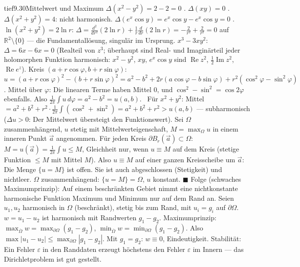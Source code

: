 \begin{loesungkarte}{tief}{9.30}{Mittelwert und Maximum}
$\Delta(x^{2} - y^{2}) = 2 - 2 = 0$ \checkmark. $\Delta(xy) = 0$ \checkmark. $\Delta(x^{2} + y^{2}) = 4$: nicht harmonisch. $\Delta(e^{x}\cos y) = e^{x}\cos y - e^{x}\cos y = 0$ \checkmark. $\ln(x^{2} + y^{2}) = 2\ln r$: $\Delta = \frac{d^{2}}{dr^{2}}(2\ln r) + \frac1r\frac d{dr}(2\ln r) = -\frac2{r^{2}} + \frac2{r^{2}} = 0$ auf $\mathbb R^{2}\setminus\{0\}$ \checkmark --- die Fundamentallösung, singulär im Ursprung. $x^{3} - 3xy^{2}$: $\Delta = 6x - 6x = 0$ \checkmark (Realteil von $z^{3}$; überhaupt sind Real- und Imaginärteil jeder holomorphen Funktion harmonisch: $x^{2} - y^{2}$, $xy$, $e^{x}\cos y$ sind $\operatorname{Re}z^{2}$, $\frac12\operatorname{Im}z^{2}$, $\operatorname{Re}e^{z}$).
Kreis $(a + r\cos\varphi, b + r\sin\varphi)$: $u = (a + r\cos\varphi)^{2} - (b + r\sin\varphi)^{2} = a^{2} - b^{2} + 2r(a\cos\varphi - b\sin\varphi) + r^{2}(\cos^{2}\varphi - \sin^{2}\varphi)$. Mittel über $\varphi$: Die linearen Terme haben Mittel $0$, und $\cos^{2} - \sin^{2} = \cos2\varphi$ ebenfalls. Also $\frac1{2\pi}\int u\,d\varphi = a^{2} - b^{2} = u(a, b)$. \checkmark\ Für $x^{2} + y^{2}$: Mittel $= a^{2} + b^{2} + r^{2}\cdot\frac1{2\pi}\int(\cos^{2} + \sin^{2}) = a^{2} + b^{2} + r^{2} > u(a, b)$ --- subharmonisch ($\Delta u > 0$: Der Mittelwert übersteigt den Funktionswert).
Sei $\Omega$ zusammenhängend, $u$ stetig mit Mittelwerteigenschaft, $M = \max_\Omega u$ in einem inneren Punkt $\vec a$ angenommen. Für jeden Kreis $\partial B_r(\vec a)\subset\Omega$: $M = u(\vec a) = \frac1{2\pi}\int u\le M$, Gleichheit nur, wenn $u\equiv M$ auf dem Kreis (stetige Funktion $\le M$ mit Mittel $M$). Also $u\equiv M$ auf einer ganzen Kreisscheibe um $\vec a$: Die Menge $\{u = M\}$ ist offen. Sie ist auch abgeschlossen (Stetigkeit) und nichtleer. $\Omega$ zusammenhängend: $\{u = M\} = \Omega$, $u$ konstant. $\blacksquare$ Folge (schwaches Maximumprinzip): Auf einem beschränkten Gebiet nimmt eine nichtkonstante harmonische Funktion Maximum und Minimum nur auf dem Rand an.
Seien $u_1, u_2$ harmonisch in $\Omega$ (beschränkt), stetig bis zum Rand, mit $u_i = g_i$ auf $\partial\Omega$. $w = u_1 - u_2$ ist harmonisch mit Randwerten $g_1 - g_2$. Maximumprinzip: $\max_{\overline\Omega}w = \max_{\partial\Omega}(g_1 - g_2)$, $\min_{\overline\Omega}w = \min_{\partial\Omega}(g_1 - g_2)$. Also $\max|u_1 - u_2|\le\max_{\partial\Omega}|g_1 - g_2|$. Mit $g_1 = g_2$: $w\equiv0$, Eindeutigkeit. Stabilität: Ein Fehler $\varepsilon$ in den Randdaten erzeugt höchstens den Fehler $\varepsilon$ im Innern --- das Dirichletproblem ist gut gestellt.

\end{loesungkarte}
